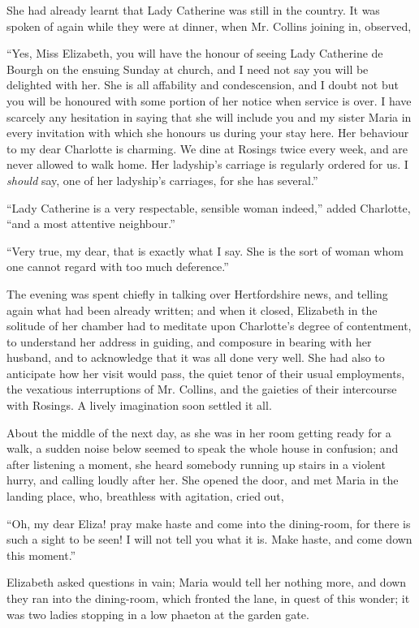She had already learnt that Lady Catherine was still
in the country. It was spoken of again while they were
at dinner, when Mr. Collins joining in, observed,

“Yes, Miss Elizabeth, you will have the honour of
seeing Lady Catherine de Bourgh on the ensuing Sunday
at church, and I need not say you will be delighted with
her. She is all affability and condescension, and I doubt not
but you will be honoured with some portion of her notice
when service is over. I have scarcely any hesitation in saying
that she will include you and my sister Maria in every
invitation with which she honours us during your stay
here. Her behaviour to my dear Charlotte is charming.
We dine at Rosings twice every week, and are never
allowed to walk home. Her ladyship’s carriage is regularly
ordered for us. I \textit{should} say, one of her ladyship’s carriages,
for she has several.”

“Lady Catherine is a very respectable, sensible woman
indeed,” added Charlotte, “and a most attentive
neighbour.”

“Very true, my dear, that is exactly what I say. She
is the sort of woman whom one cannot regard with too
much deference.”

The evening was spent chiefly in talking over Hertfordshire
news, and telling again what had been already
written; and when it closed, Elizabeth in the solitude
of her chamber had to meditate upon Charlotte’s degree
of contentment, to understand her address in guiding,
and composure in bearing with her husband, and to
acknowledge that it was all done very well. She had also
to anticipate how her visit would pass, the quiet tenor
of their usual employments, the vexatious interruptions
of Mr. Collins, and the gaieties of their intercourse with
Rosings. A lively imagination soon settled it all.

About the middle of the next day, as she was in her
room getting ready for a walk, a sudden noise below
seemed to speak the whole house in confusion; and after
listening a moment, she heard somebody running up stairs
in a violent hurry, and calling loudly after her. She
opened the door, and met Maria in the landing place, who,
breathless with agitation, cried out,

“Oh, my dear Eliza! pray make haste and come
into the dining-room, for there is such a sight to be seen!
I will not tell you what it is. Make haste, and come down
this moment.”

Elizabeth asked questions in vain; Maria would tell
her nothing more, and down they ran into the dining-room,
which fronted the lane, in quest of this wonder;
it was two ladies stopping in a low phaeton at the garden
gate.

